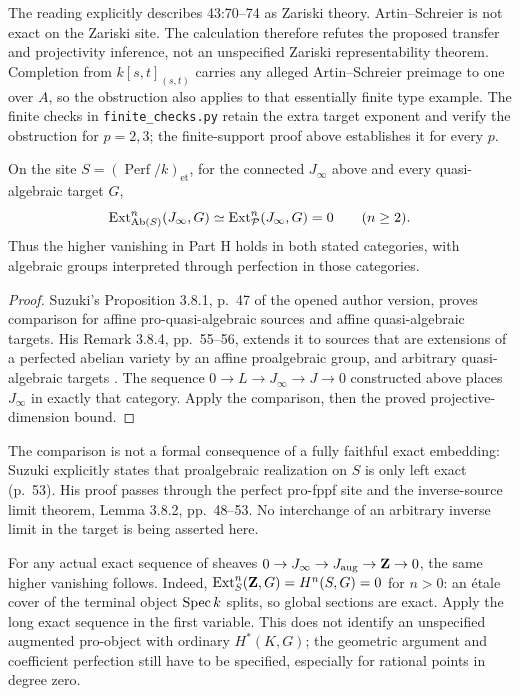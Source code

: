The reading explicitly describes 43:70--74 as Zariski theory.
Artin--Schreier is not exact on the Zariski site. The calculation
therefore refutes the proposed transfer and projectivity inference,
not an unspecified Zariski representability theorem. Completion from
$k[s,t]_{(s,t)}$ carries any alleged Artin--Schreier preimage to one
over $A$, so the obstruction also applies to that essentially finite
type example. The finite checks in \texttt{finite\_checks.py} retain
the extra target exponent and verify the obstruction for $p=2,3$;
the finite-support proof above establishes it for every $p$.

\begin{corollary}\label{h:perfect}
On the site $S=(\operatorname{Perf}/k)_{\mathrm{et}}$, for the
connected $J_\infty$ above and every quasi-algebraic target $G$,
\[
 \operatorname{Ext}^n_{\operatorname{Ab}(S)}(J_\infty,G)
   \simeq\operatorname{Ext}^n_{\mathcal P}(J_\infty,G)=0\qquad(n\geq2).
\]
Thus the higher vanishing in Part H holds in both stated categories,
with algebraic groups interpreted through perfection in those categories.
\end{corollary}
\begin{proof}
Suzuki's Proposition 3.8.1, p.~47 of the opened author version,
proves comparison for affine pro-quasi-algebraic sources and affine
quasi-algebraic targets. His Remark 3.8.4, pp.~55--56, extends it to
sources that are extensions of a perfected abelian variety by an
affine proalgebraic group, and arbitrary quasi-algebraic targets
\cite{SuzukiExt2022}. The sequence $0\to L\to J_\infty\to J\to0$
constructed above places $J_\infty$ in exactly that category.
Apply the comparison, then the proved projective-dimension bound.
\end{proof}

The comparison is not a formal consequence of a fully faithful exact
embedding: Suzuki explicitly states that proalgebraic realization on
$S$ is only left exact (p.~53). His proof passes through the perfect
pro-fppf site and the inverse-source limit theorem, Lemma 3.8.2,
pp.~48--53. No interchange of an arbitrary inverse limit in the target
is being asserted here.

For any actual exact sequence of sheaves
$0\to J_\infty\to J_{\mathrm{aug}}\to\mathbf Z\to0$, the same
higher vanishing follows. Indeed,
$\operatorname{Ext}^n_S(\mathbf Z,G)=H^n(S,G)=0$ for $n>0$: an \'etale cover of
the terminal object $\operatorname{Spec} k$ splits, so global sections are exact.
Apply the long exact sequence in the first variable. This does not
identify an unspecified augmented pro-object with ordinary
$H^*(K,G)$; the geometric argument and coefficient perfection still
have to be specified, especially for rational points in degree zero.

